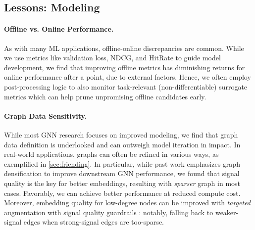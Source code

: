 \subsection{Lessons: Modeling}
\label{sec:lesson-model}

\paragraph{Offline vs. Online Performance.} 
As with many ML applications,
offline-online discrepancies are common.  
While we use metrics like validation loss, NDCG, and HitRate to guide model development, we find that improving offline metrics has diminishing returns for online performance after a point, due to external factors. 
Hence, we often employ post-processing logic to also monitor task-relevant (non-differentiable) surrogate metrics which can help prune unpromising offline candidates early.

\paragraph{Graph Data Sensitivity.} While most GNN research focuses on improved modeling, we find that graph data definition is underlooked and can outweigh model iteration in impact.  
In real-world applications, graphs can often be refined in various ways, as exemplified in \cref{sec:friending}.
In particular, while past work emphasizes graph densification \cite{zhao2021data, zhao2022graph, han2022g} to improve downstream GNN performance, 
we found that signal quality is the key for better embeddings, resulting with \emph{sparser} graph in most cases.
Favorably, we can achieve better performance at reduced compute cost. Moreover, embedding quality for low-degree nodes can be improved with \emph{targeted} augmentation with signal quality guardrails \cite{wang2023topological, guo2024node}: notably, falling back to weaker-signal edges when strong-signal edges are too-sparse.

